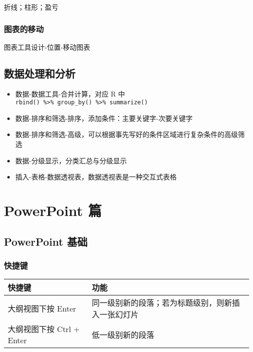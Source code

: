 \documentclass[]{ctexbook}
\providecommand{\tightlist}{%
  \setlength{\itemsep}{0pt}\setlength{\parskip}{0pt}}
\begin{document}
折线；柱形；盈亏

\hypertarget{ux56feux8868ux7684ux79fbux52a8}{%
\section{图表的移动}\label{ux56feux8868ux7684ux79fbux52a8}}

图表工具\textbar 设计-位置-移动图表

\hypertarget{ux6570ux636eux5904ux7406ux548cux5206ux6790}{%
\chapter{数据处理和分析}\label{ux6570ux636eux5904ux7406ux548cux5206ux6790}}

\begin{itemize}
\tightlist
\item
  数据-数据工具-合并计算，对应 R 中 \texttt{rbind()\ \%\textgreater{}\%\ group\_by()\ \%\textgreater{}\%\ summarize()}
\item
  数据-排序和筛选-排序，添加条件：主要关键字-次要关键字
\item
  数据-排序和筛选-高级，可以根据事先写好的条件区域进行复杂条件的高级筛选
\item
  数据-分级显示，分类汇总与分级显示
\item
  插入-表格-数据透视表，数据透视表是一种交互式表格
\end{itemize}

\cleardoublepage

\hypertarget{part-powerpoint-ux7bc7}{%
\part{PowerPoint 篇}\label{part-powerpoint-ux7bc7}}

\hypertarget{chapter-PowerPoint-basic}{%
\chapter{PowerPoint 基础}\label{chapter-PowerPoint-basic}}

\hypertarget{ux5febux6377ux952e-1}{%
\section{快捷键}\label{ux5febux6377ux952e-1}}

\begin{longtable}[]{@{}ll@{}}
\toprule
快捷键 & 功能\tabularnewline
\midrule
\endhead
大纲视图下按 Enter & 同一级别新的段落；若为标题级别，则新插入一张幻灯片\tabularnewline
大纲视图下按 Ctrl + Enter & 低一级别新的段落\tabularnewline
\bottomrule
\end{longtable}
\end{document}
